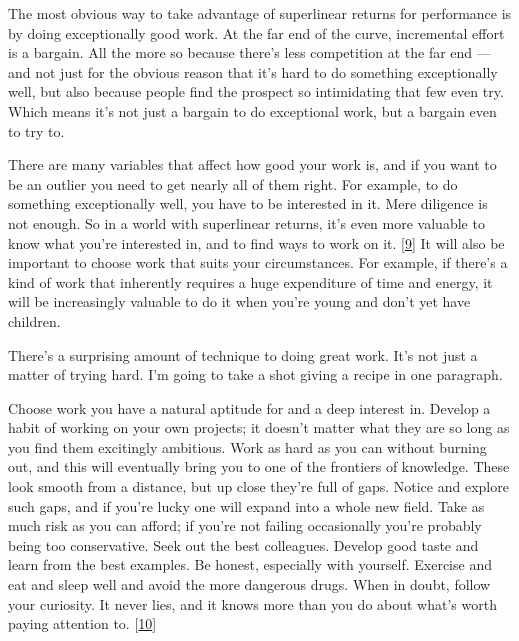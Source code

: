 The most
                  obvious way to take advantage of superlinear returns for
                  performance is by doing exceptionally good work. At the far
                  end of the curve, incremental effort is a bargain. All the
                  more so because there's less competition at the far end
                  --- and not just for the obvious reason that it's hard to
                  do something exceptionally well, but also because people find
                  the prospect so intimidating that few even try. Which means
                  it's not just a bargain to do exceptional work, but a bargain
                  even to try to.

There are many variables that
                  affect how good your work is, and if you want to be an outlier
                  you need to get nearly all of them right. For example, to do
                  something exceptionally well, you have to be interested in it.
                  Mere diligence is not enough. So in a world with superlinear
                  returns, it's even more valuable to know what you're
                  interested in, and to find ways to work on it.
                  [\href{\#f9n}{9}]
                  It will also be important to choose work that suits your
                  circumstances. For example, if there's a kind of work that
                  inherently requires a huge expenditure of time and energy, it
                  will be increasingly valuable to do it when you're young and
                  don't yet have children.

There's a surprising
                  amount of technique to doing great work. It's not just a
                  matter of trying hard. I'm going to take a shot giving a
                  recipe in one paragraph.

Choose work you have a
                  natural aptitude for and a deep interest in. Develop a habit
                  of working on your own projects; it doesn't matter what they
                  are so long as you find them excitingly ambitious. Work as
                  hard as you can without burning out, and this will eventually
                  bring you to one of the frontiers of knowledge. These look
                  smooth from a distance, but up close they're full of gaps.
                  Notice and explore such gaps, and if you're lucky one will
                  expand into a whole new field. Take as much risk as you can
                  afford; if you're not failing occasionally you're probably
                  being too conservative. Seek out the best colleagues. Develop
                  good taste and learn from the best examples. Be honest,
                  especially with yourself. Exercise and eat and sleep well and
                  avoid the more dangerous drugs. When in doubt, follow your
                  curiosity. It never lies, and it knows more than you do about
                  what's worth paying attention to.
                  [\href{\#f10n}{10}]

